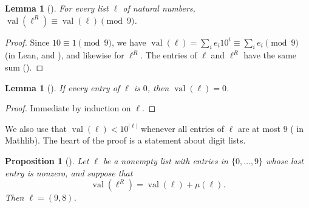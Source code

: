 \documentclass[11pt]{amsart}
\theoremstyle{plain}
\newtheorem{lemma}[theorem]{Lemma}
\newtheorem{proposition}[theorem]{Proposition}
\theoremstyle{definition}
\newcommand{\val}{\operatorname{val}}
\begin{document}
\begin{lemma}[]\label{lem:mod9}
For every list $\ell$ of natural numbers, $\val(\ell^R)\equiv\val(\ell)\pmod 9$.
\end{lemma}

\begin{proof}
Since $10\equiv1\pmod9$, we have $\val(\ell)=\sum_i e_i10^i\equiv\sum_i e_i\pmod 9$ (in Lean,  and ), and likewise for $\ell^R$. The entries of $\ell$ and $\ell^R$ have the same sum ().
\end{proof}

\begin{lemma}[]\label{lem:zero}
If every entry of $\ell$ is $0$, then $\val(\ell)=0$.
\end{lemma}

\begin{proof}
Immediate by induction on $\ell$.
\end{proof}

We also use that $\val(\ell)<10^{|\ell|}$ whenever all entries of $\ell$ are at most $9$ ( in Mathlib). The heart of the proof is a statement about digit lists.

\begin{proposition}[]\label{prop:key}
Let $\ell$ be a nonempty list with entries in $\{0,\dots,9\}$ whose last entry is nonzero, and suppose that
\begin{equation}\label{eq:hyp}
  \val(\ell^R)=\val(\ell)+\mu(\ell).
\end{equation}
Then $\ell=(9,8)$.
\end{proposition}
\end{document}
